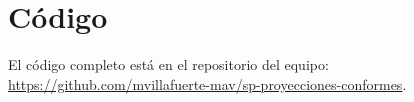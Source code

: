\section{Código}
El código completo está en el repositorio del equipo: \url{https://github.com/mvillafuerte-mav/sp-proyecciones-conformes}.
